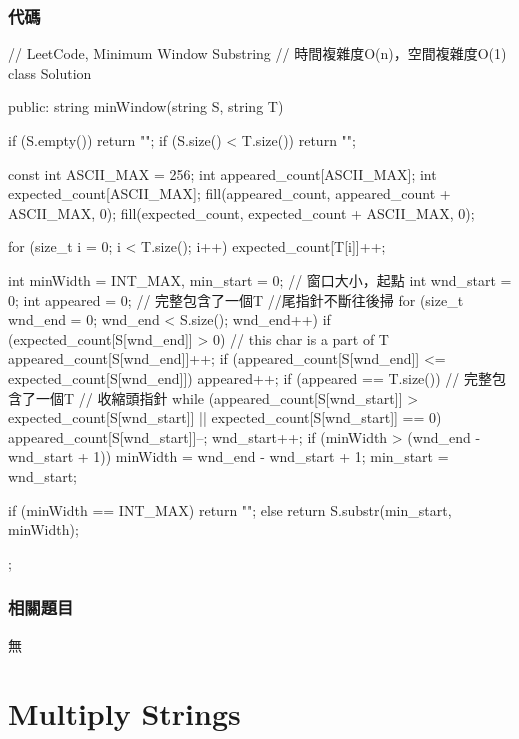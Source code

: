 \subsubsection{代碼}
\begin{Code}
// LeetCode, Minimum Window Substring
// 時間複雜度O(n)，空間複雜度O(1)
class Solution {
public:
    string minWindow(string S, string T) {
        if (S.empty()) return "";
        if (S.size() < T.size()) return "";

        const int ASCII_MAX = 256;
        int appeared_count[ASCII_MAX];
        int expected_count[ASCII_MAX];
        fill(appeared_count, appeared_count + ASCII_MAX, 0);
        fill(expected_count, expected_count + ASCII_MAX, 0);

        for (size_t i = 0; i < T.size(); i++) expected_count[T[i]]++;

        int minWidth = INT_MAX, min_start = 0;  // 窗口大小，起點
        int wnd_start = 0;
        int appeared = 0;  // 完整包含了一個T
        //尾指針不斷往後掃
        for (size_t wnd_end = 0; wnd_end < S.size(); wnd_end++) {
            if (expected_count[S[wnd_end]] > 0)  {  // this char is a part of T
                appeared_count[S[wnd_end]]++;
                if (appeared_count[S[wnd_end]] <= expected_count[S[wnd_end]])
                    appeared++;
            }
            if (appeared == T.size()) {  // 完整包含了一個T
                // 收縮頭指針
                while (appeared_count[S[wnd_start]] > expected_count[S[wnd_start]]
                        || expected_count[S[wnd_start]] == 0) {
                    appeared_count[S[wnd_start]]--;
                    wnd_start++;
                }
                if (minWidth > (wnd_end - wnd_start + 1)) {
                    minWidth = wnd_end - wnd_start + 1;
                    min_start = wnd_start;
                }
            }
        }

        if (minWidth == INT_MAX) return "";
        else return S.substr(min_start, minWidth);
    }
};
\end{Code}


\subsubsection{相關題目}

\begindot
\item 無
\myenddot


\section{Multiply Strings} %
\label{sec:multiply-strings}


